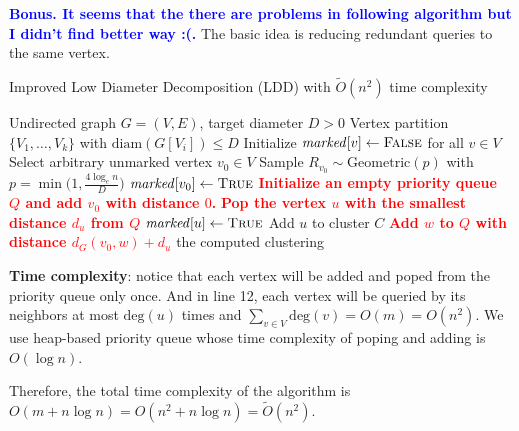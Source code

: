 \begin{answer}
\begin{enumerate}[label=\alph*).]
        \textcolor{blue}{\textbf{Bonus. It seems that the there are problems in following algorithm but I didn't find better way :(.}}
        The basic idea is reducing redundant queries to the same vertex.
        \begin{algo}
            \caption{Improved Low Diameter Decomposition (LDD) with $\tilde{O}(n^2)$ time complexity}
            \label{alg:improved-ldd}
            \begin{algorithmic}[1]
            \Require Undirected graph $G=(V,E)$, target diameter $D > 0$
            \Ensure Vertex partition $\{V_1, \dots, V_k\}$ with $\mathrm{diam}(G[V_i]) \leq D$
            \State Initialize $\mathit{marked}[v] \gets \textsc{False}$ for all $v \in V$
                \State Select arbitrary unmarked vertex $v_0 \in V$
                \State Sample $R_{v_0} \sim \mathrm{Geometric}(p)$ with $p = \min\big(1, \frac{4\log_e n}{D}\big)$
                \State $\mathit{marked}[v_0] \gets \textsc{True}$
                \State \textcolor{red}{\textbf{Initialize an empty priority queue $Q$ and add $v_0$ with distance $0$.}} 
                    \State \textcolor{red}{\textbf{Pop the vertex $u$ with the smallest distance $d_u$ from $Q$}}
                        \State $\mathit{marked}[u] \gets \textsc{True}$
                        \State Add $u$ to cluster $C$
                    \EndIf
                            \State \textcolor{red}{\textbf{Add $w$ to $Q$ with distance $d_G(v_0, w)+ d_u$}}
                        \EndIf
                    \EndFor
                \EndWhile
            \EndWhile
            \State \Return the computed clustering
            \end{algorithmic}
        \end{algo}
        \textbf{Time complexity}: notice that each vertex will be added and poped from the priority queue only once.
        And in line 12, each vertex will be queried by its neighbors at most $\text{deg}(u)$ times and $\sum_{v \in V} \text{deg}(v) = O(m) = O(n^2)$. 
        We use heap-based priority queue whose time complexity of poping and adding is $O(\log n)$. 
        
        Therefore, the total time complexity of the algorithm is $O(m + n\log n) = O(n^2 + n\log n) = \tilde{O}(n^2)$.


\end{enumerate}
\end{answer}
